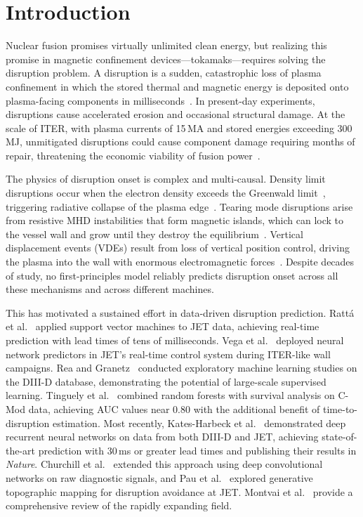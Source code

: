 \documentclass[twocolumn,prl,aps,superscriptaddress,floatfix]{revtex4-2}
\begin{document}
\section{Introduction}
\label{sec:introduction}

Nuclear fusion promises virtually unlimited clean energy, but realizing this promise in magnetic confinement devices---tokamaks---requires solving the disruption problem. A disruption is a sudden, catastrophic loss of plasma confinement in which the stored thermal and magnetic energy is deposited onto plasma-facing components in milliseconds~\cite{deVries2011,Schuller1995}. In present-day experiments, disruptions cause accelerated erosion and occasional structural damage. At the scale of ITER, with plasma currents of 15\,MA and stored energies exceeding 300\,MJ, unmitigated disruptions could cause component damage requiring months of repair, threatening the economic viability of fusion power~\cite{Boozer2012,Lehnen2015,ITER2018}.

The physics of disruption onset is complex and multi-causal. Density limit disruptions occur when the electron density exceeds the Greenwald limit~\cite{Greenwald1988}, triggering radiative collapse of the plasma edge~\cite{Greenwald2002}. Tearing mode disruptions arise from resistive MHD instabilities that form magnetic islands, which can lock to the vessel wall and grow until they destroy the equilibrium~\cite{deVries2011}. Vertical displacement events (VDEs) result from loss of vertical position control, driving the plasma into the wall with enormous electromagnetic forces~\cite{Boozer2012}. Despite decades of study, no first-principles model reliably predicts disruption onset across all these mechanisms and across different machines.

This has motivated a sustained effort in data-driven disruption prediction. Ratt\'a et al.~\cite{Ratta2010} applied support vector machines to JET data, achieving real-time prediction with lead times of tens of milliseconds. Vega et al.~\cite{Vega2014} deployed neural network predictors in JET's real-time control system during ITER-like wall campaigns. Rea and Granetz~\cite{Rea2018} conducted exploratory machine learning studies on the DIII-D database, demonstrating the potential of large-scale supervised learning. Tinguely et al.~\cite{Tinguely2019} combined random forests with survival analysis on C-Mod data, achieving AUC values near 0.80 with the additional benefit of time-to-disruption estimation. Most recently, Kates-Harbeck et al.~\cite{KatesHarbeck2019} demonstrated deep recurrent neural networks on data from both DIII-D and JET, achieving state-of-the-art prediction with 30\,ms or greater lead times and publishing their results in \textit{Nature}. Churchill et al.~\cite{Churchill2020} extended this approach using deep convolutional networks on raw diagnostic signals, and Pau et al.~\cite{Pau2019} explored generative topographic mapping for disruption avoidance at JET. Montvai et al.~\cite{Montvai2023} provide a comprehensive review of the rapidly expanding field.
\end{document}
